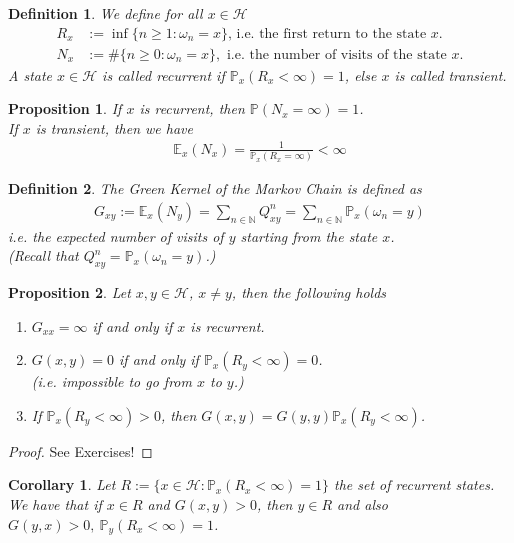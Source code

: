 \documentclass[11pt,a4paper, final]{article}
\newtheorem{prop}{Proposition}[section]
\newtheorem{cor}{Corollary}[section]
\newtheorem{defn}{Definition}[section]
\theoremstyle{definition}
\begin{document}
\begin{defn} We define for all $x \in \mathcal{H}$
\begin{align*}
R_x &:= \inf \lbrace n \geq 1 : \omega_n = x \rbrace \text{, i.e. the first return to the state $x$.} \\
N_x &:= \# \lbrace n \geq 0 : \omega_n =x \rbrace, \text{ i.e. the number of visits of the state $x$.}
\end{align*}
A state $x \in \mathcal{H}$ is called recurrent if $\mathbb{P}_x ( R_x < \infty ) =1$, else $x$ is called transient. 
\end{defn}
\begin{prop} If $x$ is recurrent, then $\mathbb{P}(N_x = \infty) =1$. \\  If $x$ is transient, then we have 
\begin{align*}
\mathbb{E}_x ( N_x)= \frac{1}{\mathbb{P}_x(R_x = \infty)} < \infty 
\end{align*}
\end{prop}
\begin{defn} The Green Kernel of the Markov Chain is defined as
\begin{align*}
G_{xy}:= \mathbb{E}_x ( N_y) = \sum_{n \in \mathbb{N}} Q_{xy}^n = \sum_{n \in \mathbb{N}} \mathbb{P}_x ( \omega_n =y) 
\end{align*}
i.e. the expected number of visits of $y$ starting from the state $x$. \\ (Recall that $Q_{xy}^n = \mathbb{P}_x( \omega_n =y)$.)
\end{defn}
\begin{prop} Let $x,y \in \mathcal{H}$, $x \neq y$, then the following holds
\begin{enumerate}
\item $G_{xx}= \infty$ if and only if $x$ is recurrent.
\item $G(x,y)=0$ if and only if $\mathbb{P}_x (R_y < \infty) =0$. 
\\  (i.e. impossible to go from $x$ to $y$.)
\item If $\mathbb{P}_x( R_y < \infty) >0$, then $G(x,y)= G(y,y) \mathbb{P}_x( R_y < \infty)$.
\end{enumerate}
\end{prop}
\begin{proof}
See Exercises!
\end{proof}
\newpage
\begin{cor}
Let $R:= \lbrace x \in \mathcal{H} : \mathbb{P}_x ( R_x < \infty) = 1 \rbrace$ the set of recurrent states. We have that if $x \in R$ and $G(x,y) > 0$, then $y \in R$ and also $G(y,x)>0,  \ \mathbb{P}_y(R_x < \infty ) =1$. 
\end{cor}
\end{document}
